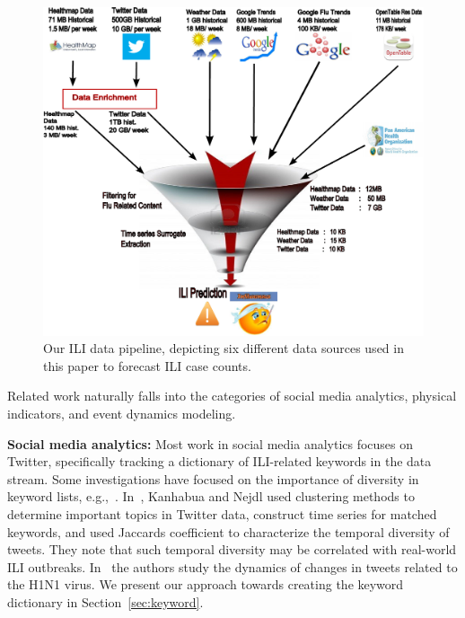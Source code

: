 
\begin{figure}[t] \centering
  \captionsetup{font=scriptsize}
    \includegraphics[width=0.95\columnwidth]{fig/ili_data_pipeline.pdf}
    \caption{\label{fig:ili_data_pipeline} Our ILI data pipeline, depicting 
six different data sources used in this paper to forecast ILI case counts.}
\vspace{-2em}
 \end{figure}

Related work naturally falls into the categories of social media
analytics, physical indicators, and event dynamics modeling. 
 
\textbf{Social media analytics:}
Most work in social media analytics focuses on Twitter, specifically tracking
a dictionary of ILI-related keywords in the data stream.
Some investigations have focused on the importance of diversity in keyword 
lists, e.g.,~\cite{ref5, ref6}. In~\cite{ref5}, 
Kanhabua and Nejdl used clustering methods to determine
important topics in Twitter data, construct time series for matched keywords,
and used Jaccards coefficient to characterize the temporal
diversity of tweets. They note that such temporal diversity may be
correlated with real-world ILI outbreaks. In~\cite{ref6}
the authors study the dynamics of changes in tweets related to the H1N1 virus. We 
present our approach towards creating the keyword dictionary in Section~\ref{sec:keyword}.

